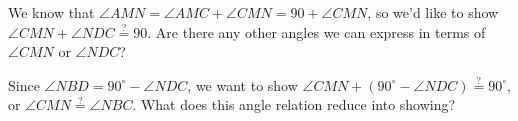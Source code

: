 



We know that $\angle AMN = \angle AMC + \angle CMN = 90 + \angle CMN$, so we'd like to show $\angle CMN + \angle NDC \stackrel{?}{=} 90$. Are there any other angles we can express in terms of $\angle CMN$ or $\angle NDC$?







Since $\angle NBD = 90^\circ - \angle NDC$, we want to show $\angle CMN + (90^\circ - \angle NDC) \stackrel{?}{=} 90^\circ$, or $\angle CMN \stackrel{?}{=} \angle NBC$. What does this angle relation reduce into showing?








